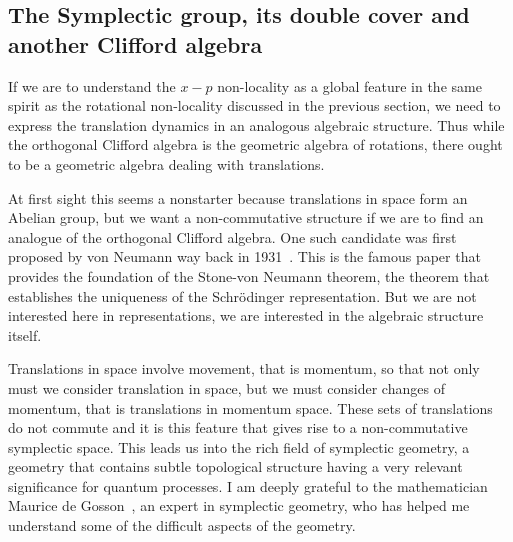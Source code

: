 \documentclass[12pt]{article}
\begin{document}
\subsection{The Symplectic group, its double cover and another Clifford algebra}

If we are to understand the $x - p$ non-locality as a global feature in the same spirit as the rotational non-locality discussed in the previous section, we need to express the translation dynamics in an analogous algebraic structure. Thus while the orthogonal Clifford algebra is the geometric algebra of rotations, there ought to be a geometric algebra dealing with translations. 

At first sight this seems a nonstarter because translations in space form an Abelian group, but we want a non-commutative structure if we are to find an analogue of the orthogonal Clifford algebra.  One such candidate was first proposed by von Neumann way back in 1931~\cite{vn31}.  This is the famous paper that provides the foundation of the Stone-von Neumann theorem, the theorem that establishes the uniqueness of the Schr\"{o}dinger representation.  But we are not interested here in representations, we are interested in the algebraic structure itself.


Translations in space involve movement, that is momentum, so that not only must we consider translation in space, but we must consider  changes of momentum, that is translations in momentum space.  These sets of translations do not commute and it is this feature that gives rise to   a non-commutative symplectic space. This leads us into the rich field of symplectic geometry, a geometry that contains subtle topological structure having a very relevant significance for quantum processes.  I am deeply grateful to the mathematician Maurice de Gosson~\cite{mdg01, mdg10}, an expert in symplectic geometry, who has helped me understand some of the difficult aspects of the geometry.
\end{document}
